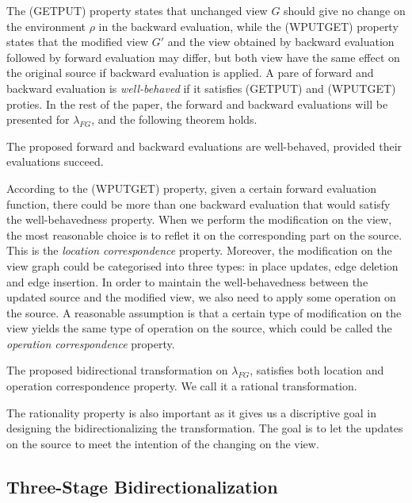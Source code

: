 \documentclass{llncs}
\begin{document}
The (GETPUT) property states that unchanged view $G$ should give no change on the environment $\rho$ in the backward evaluation, while the (WPUTGET) property states that the modified view $G'$ and the view obtained by backward evaluation followed by forward evaluation may differ, but both view have the same effect on the original source if backward evaluation is applied. A pare of forward and backward evaluation is \emph{well-behaved} if it satisfies (GETPUT) and (WPUTGET) proties. In the rest of the paper, the forward and backward evaluations will be presented for $\lambda_{FG}$, and the following theorem holds.

\begin{theorem}\label{th:wellb}
The proposed forward and backward evaluations are well-behaved, provided their evaluations succeed.
\end{theorem}

According to the (WPUTGET) property, given a certain forward evaluation function, there could be more than one backward evaluation that would satisfy the well-behavedness property. When we perform the modification on the view, the most reasonable choice is to reflet it on the corresponding part on the source. This is the \emph{location correspondence} property. Moreover, the modification on the view graph could be categorised into three types: in place updates, edge deletion and edge insertion. In order to maintain the well-behavedness between the updated source and the modified view, we also need to apply some operation on the source. A reasonable assumption is that a certain type of modification on the view yields the same type of operation on the source, which could be called the \emph{operation correspondence} property.

\begin{theorem}[Rationality]\label{th:rat}
The proposed bidirectional transformation on $\lambda_{FG}$, satisfies both location and operation correspondence property. We call it a rational transformation.
\end{theorem}

The rationality property is also important as it gives us a discriptive goal in designing the bidirectionalizing the transformation. The goal is to let the updates on the source to meet the intention of the changing on the view.

\subsection{Three-Stage Bidirectionalization}\label{subsec:3-sta}
\end{document}
